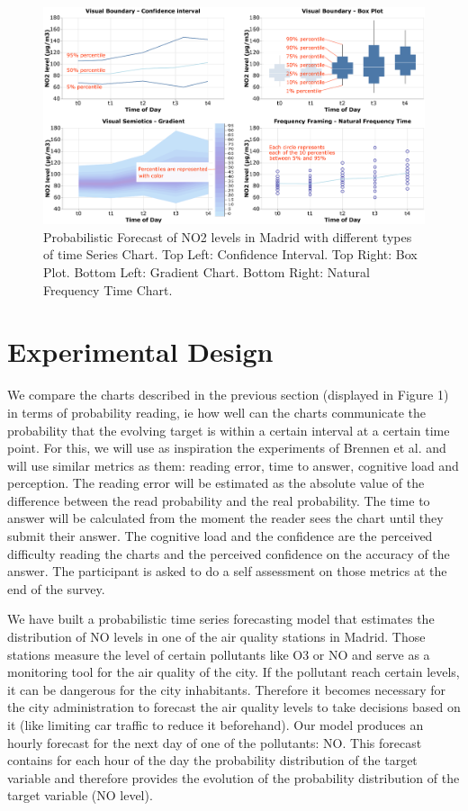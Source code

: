 \documentclass[a4paper,3p,sort&compress]{elsarticle}
\begin{document}
\begin{figure}
  \centering
  \includegraphics[width=.9\textwidth]{charts_vector} 
  \caption{\label{figure:charts} Probabilistic Forecast of NO2 levels in Madrid with different types of time Series Chart. 
  Top Left: Confidence Interval. Top Right: Box Plot. 
  Bottom Left: Gradient Chart. Bottom Right: Natural Frequency Time Chart. }
\end{figure} 

\section{Experimental Design}
\label{sec:exp_design}

We compare the charts described in the previous section (displayed in Figure 1) 
in terms of probability 
reading, ie how well 
can the charts communicate the probability that the evolving target is within a certain interval 
at a certain time point.
 For this, we will use as inspiration the experiments of Brennen et al. \cite{brennen_instrument_2018}
and will use similar metrics 
as them: reading error, time to answer, cognitive load and perception. The reading error will be estimated as the 
absolute value of the difference between the read probability and the real probability. The time to answer 
will be calculated from the moment the reader sees the chart until they submit their answer. The cognitive 
load and the confidence are the perceived difficulty reading the charts and the perceived confidence on 
the accuracy of 
the answer. The participant is asked to do a self assessment on those metrics at the end of the survey.

We have built a probabilistic time series forecasting model that estimates the distribution of NO 
levels in one of the air quality stations in Madrid. Those stations measure the level of certain 
pollutants like O3 or NO and serve as a monitoring tool for the air quality of the city. If the pollutant 
reach certain levels, it can be dangerous for the city inhabitants. Therefore it becomes necessary 
for the city administration to 
forecast the air quality levels to take decisions based on it (like limiting car traffic to reduce it beforehand).
Our model produces an hourly forecast for the next day of one of the pollutants: NO. This forecast contains
for each hour of the day the probability distribution of the target variable and therefore provides the evolution 
of the probability distribution of the target variable (NO level).
\end{document}
